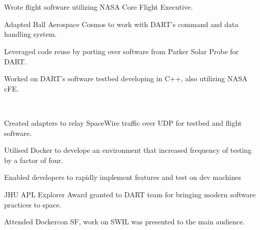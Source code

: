 \documentclass[]{deedy-resume-openfont}
\begin{document}
\hfill{}\\
\hfill {}\\
	\begin{tightemize}
		\item Wrote flight software utilizing NASA Core Flight Executive.
		\item Adapted Ball Aerospace Cosmos to work with DART's command and data handling system.
		\item Leveraged code reuse by porting over software from Parker Solar Probe for DART.
		\item Worked on DART's software testbed developing in C++, also utilizing NASA cFE.
	\end{tightemize}

\\
\begin{tightemize}
	\item Created adapters to relay SpaceWire traffic over UDP for testbed and flight software.
	\item Utilised Docker to develope an environment that increased frequency of testing by a factor of four.
	\item Enabled developers to rapidly implement features and test on dev machines
	\item JHU APL Explorer Award granted to DART team for bringing modern software practices to space.
	\item Attended Dockercon SF, work on SWIL was presented to the main audience.
\end{tightemize}
	
\end{document}
